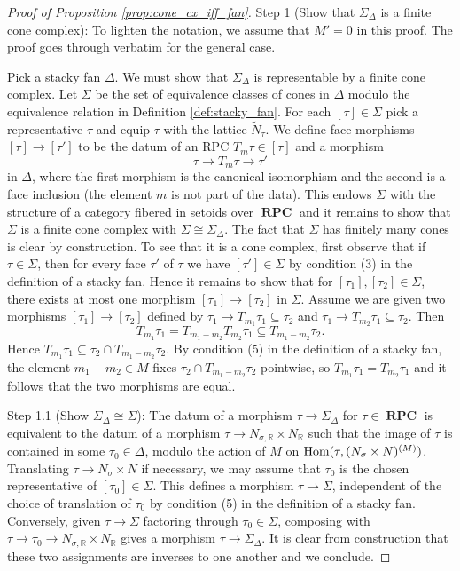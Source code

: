 \documentclass[11pt]{amsart}
\theoremstyle{definition}
\theoremstyle{remark}
\DeclareMathOperator{\RPC}{\mathbf{RPC}}
\DeclareMathOperator{\Hom}{\textup{Hom}}
\begin{document}
\begin{proof}[Proof of Proposition \ref{prop:cone_cx_iff_fan}]
	Step 1 (Show that $\Sigma_{\Delta}$ is a finite cone complex): To lighten the notation, we assume that $M'=0$ in this proof. The proof goes through verbatim for the general case.

	Pick a stacky fan $\Delta$. We must show that $\Sigma_{\Delta}$ is representable by a finite cone complex.
	Let $\Sigma$ be the set of equivalence classes of cones in $\Delta$ modulo the equivalence relation in Definition
	\ref{def:stacky_fan}. For each $[\tau]\in \Sigma$ pick a representative $\tau$ and equip $\tau$ with the lattice $\tilde{N}_{\tau}$.
	We define face morphisms $[\tau]\to [\tau']$ to be the datum
	of an RPC $T_m\tau\in [\tau]$ and a morphism
	$$\tau\to T_m\tau\to \tau'$$
	in $\Delta$, where the first
	morphism is the canonical isomorphism and the second is a face inclusion (the element $m$ is not part of the data). This endows
	$\Sigma$ with the structure of a category fibered in setoids over $\RPC$ and it remains to show that $\Sigma$ is a finite cone complex with
	$\Sigma\cong \Sigma_{\Delta}$. The fact that $\Sigma$ has finitely many cones is clear by construction.
	To see that it is a cone complex, first observe that
	if $\tau\in \Sigma$, then for every face $\tau'$ of $\tau$ we have $[\tau']\in \Sigma$ by condition (3) in the definition of a stacky fan. Hence it remains
	to show that for $[\tau_1],[\tau_2]\in \Sigma$, there exists at most one morphism $[\tau_1]\to [\tau_2]$ in $\Sigma$. Assume we are
	given two morphisms $[\tau_1]\to [\tau_2]$ defined by $\tau_1\to T_{m_1}\tau_1\subseteq\tau_2$ and $\tau_1\to T_{m_2}\tau_1\subseteq\tau_2$.
	Then
	$$T_{m_1}\tau_1=T_{m_1-m_2}T_{m_2}\tau_1\subseteq T_{m_1-m_2}\tau_2.$$
	Hence $T_{m_1}\tau_1\subseteq \tau_2\cap T_{m_1-m_2}\tau_2$.
	By condition (5) in the definition of a stacky fan, the element $m_1-m_2\in M$ fixes $\tau_2\cap T_{m_1-m_2}\tau_2$ pointwise,
	so $T_{m_1}\tau_1=T_{m_2}\tau_1$ and it follows that the two morphisms are equal.

	Step 1.1 (Show $\Sigma_{\Delta}\cong \Sigma$): The datum of a morphism $\tau\to \Sigma_{\Delta}$ for $\tau\in \RPC$
	is equivalent to the datum of a morphism $\tau\to N_{\sigma,\mathbb{R}}\times N_{\mathbb{R}}$ such that the image of $\tau$ is contained
	in some $\tau_0\in \Delta$, modulo the action of $M$ on $\Hom(\tau,(N_{\sigma}\times N)^{(M)})$. Translating $\tau\to N_{\sigma}\times N$
	if necessary, we may assume that $\tau_0$ is the chosen representative of $[\tau_0]\in \Sigma$. This defines a morphism $\tau\to \Sigma$,
	independent of the choice of translation of $\tau_0$ by condition (5) in the definition of a stacky fan. Conversely, given $\tau\to \Sigma$ factoring through
	$\tau_0\in \Sigma$, composing with $\tau\to \tau_0\to N_{\sigma,\mathbb{R}}\times N_{\mathbb{R}}$ gives a morphism $\tau\to \Sigma_{\Delta}$. It is clear from
	construction that these two assignments are inverses to one another and we conclude.


\end{proof}
\end{document}
